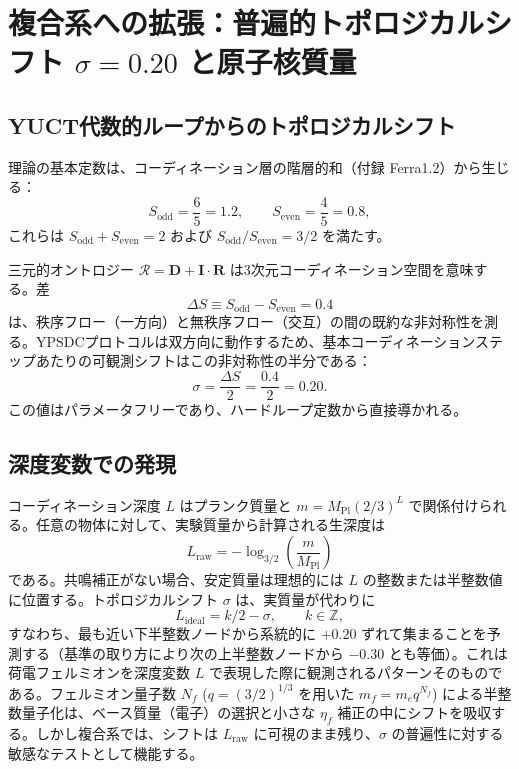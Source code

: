 \documentclass[12pt,a4paper]{article}
\begin{document}
	\section{複合系への拡張：普遍的トポロジカルシフト \(\sigma=0.20\) と原子核質量}
	\label{sec:sigma_nuclear}
	
	\subsection{YUCT代数的ループからのトポロジカルシフト}
	
	理論の基本定数は、コーディネーション層の階層的和（付録 Ferra1.2）から生じる：
	\[
	S_{\mathrm{odd}} = \frac{6}{5}=1.2,\qquad S_{\mathrm{even}} = \frac{4}{5}=0.8,
	\]
	これらは \(S_{\mathrm{odd}}+S_{\mathrm{even}}=2\) および \(S_{\mathrm{odd}}/S_{\mathrm{even}}=3/2\) を満たす。
	
	三元的オントロジー \(\mathcal{R} = \mathbf{D} + \mathbf{I}\!\cdot\!\mathbf{R}\) は3次元コーディネーション空間を意味する。差
	\[
	\Delta S \equiv S_{\mathrm{odd}} - S_{\mathrm{even}} = 0.4
	\]
	は、秩序フロー（一方向）と無秩序フロー（交互）の間の既約な非対称性を測る。YPSDCプロトコルは双方向に動作するため、基本コーディネーションステップあたりの可観測シフトはこの非対称性の半分である：
	\begin{equation}
		\boxed{\sigma = \frac{\Delta S}{2} = \frac{0.4}{2} = 0.20.}
		\label{eq:sigma_fermion_paper}
	\end{equation}
	この値はパラメータフリーであり、ハードループ定数から直接導かれる。
	
	\subsection{深度変数での発現}
	
	コーディネーション深度 \(L\) はプランク質量と \(m = M_{\mathrm{Pl}}(2/3)^L\) で関係付けられる。任意の物体に対して、実験質量から計算される生深度は
	\begin{equation}
		L_{\mathrm{raw}} = -\log_{3/2}\!\left(\frac{m}{M_{\mathrm{Pl}}}\right)
	\end{equation}
	である。共鳴補正がない場合、安定質量は理想的には \(L\) の整数または半整数値に位置する。トポロジカルシフト \(\sigma\) は、実質量が代わりに
	\[
	L_{\mathrm{ideal}} = k/2 - \sigma, \qquad k\in\mathbb{Z},
	\]
	すなわち、最も近い下半整数ノードから系統的に \(+0.20\) ずれて集まることを予測する（基準の取り方により次の上半整数ノードから \(-0.30\) とも等価）。これは荷電フェルミオンを深度変数 \(L\) で表現した際に観測されるパターンそのものである。フェルミオン量子数 \(N_f\) (\(q=(3/2)^{1/3}\) を用いた \(m_f = m_e q^{N_f}\)) による半整数量子化は、ベース質量（電子）の選択と小さな \(\eta_f\) 補正の中にシフトを吸収する。しかし複合系では、シフトは \(L_{\mathrm{raw}}\) に可視のまま残り、\(\sigma\) の普遍性に対する敏感なテストとして機能する。
	
\end{document}
